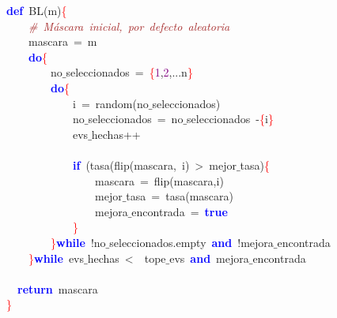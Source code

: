 \noindent
\mbox{}\textbf{\textcolor{Blue}{def}}\ BL\textcolor{BrickRed}{(}m\textcolor{BrickRed}{)}\textcolor{Red}{\{} \\
\mbox{}\ \ \ \ \textit{\textcolor{Brown}{\#\ Máscara\ inicial,\ por\ defecto\ aleatoria}} \\
\mbox{}\ \ \ \ mascara\ \textcolor{BrickRed}{=}\ m \\
\mbox{}\ \ \ \ \textbf{\textcolor{Blue}{do}}\textcolor{Red}{\{} \\
\mbox{}\ \ \ \ \ \ \ \ no$\_$seleccionados\ \textcolor{BrickRed}{=}\ \textcolor{Red}{\{}\textcolor{Purple}{1}\textcolor{BrickRed}{,}\textcolor{Purple}{2}\textcolor{BrickRed}{,...}n\textcolor{Red}{\}} \\
\mbox{}\ \ \ \ \ \ \ \ \textbf{\textcolor{Blue}{do}}\textcolor{Red}{\{} \\
\mbox{}\ \ \ \ \ \ \ \ \ \ \ \ i\ \textcolor{BrickRed}{=}\ random\textcolor{BrickRed}{(}no$\_$seleccionados\textcolor{BrickRed}{)} \\
\mbox{}\ \ \ \ \ \ \ \ \ \ \ \ no$\_$seleccionados\ \textcolor{BrickRed}{=}\ no$\_$seleccionados\ \textcolor{BrickRed}{-}\textcolor{Red}{\{}i\textcolor{Red}{\}} \\
\mbox{}\ \ \ \ \ \ \ \ \ \ \ \ evs$\_$hechas\textcolor{BrickRed}{++} \\
\mbox{} \\
\mbox{}\ \ \ \ \ \ \ \ \ \ \ \ \textbf{\textcolor{Blue}{if}}\ \textcolor{BrickRed}{(}tasa\textcolor{BrickRed}{(}flip\textcolor{BrickRed}{(}mascara\textcolor{BrickRed}{,}\ i\textcolor{BrickRed}{)}\ \textcolor{BrickRed}{\textgreater{}}\ mejor$\_$tasa\textcolor{BrickRed}{)}\textcolor{Red}{\{} \\
\mbox{}\ \ \ \ \ \ \ \ \ \ \ \ \ \ \ \ mascara\ \textcolor{BrickRed}{=}\ flip\textcolor{BrickRed}{(}mascara\textcolor{BrickRed}{,}i\textcolor{BrickRed}{)} \\
\mbox{}\ \ \ \ \ \ \ \ \ \ \ \ \ \ \ \ mejor$\_$tasa\ \textcolor{BrickRed}{=}\ tasa\textcolor{BrickRed}{(}mascara\textcolor{BrickRed}{)} \\
\mbox{}\ \ \ \ \ \ \ \ \ \ \ \ \ \ \ \ mejora$\_$encontrada\ \textcolor{BrickRed}{=}\ \textbf{\textcolor{Blue}{true}} \\
\mbox{}\ \ \ \ \ \ \ \ \ \ \ \ \textcolor{Red}{\}} \\
\mbox{}\ \ \ \ \ \ \ \ \textcolor{Red}{\}}\textbf{\textcolor{Blue}{while}}\ \textcolor{BrickRed}{!}no$\_$seleccionados\textcolor{BrickRed}{.}empty\ \textbf{\textcolor{Blue}{and}}\ \textcolor{BrickRed}{!}mejora$\_$encontrada \\
\mbox{}\ \ \ \ \textcolor{Red}{\}}\textbf{\textcolor{Blue}{while}}\ evs$\_$hechas\ \textcolor{BrickRed}{\textless{}}\ \ tope$\_$evs\ \textbf{\textcolor{Blue}{and}}\ mejora$\_$encontrada \\
\mbox{} \\
\mbox{}\ \ \textbf{\textcolor{Blue}{return}}\ mascara \\
\mbox{}\textcolor{Red}{\}} \\
\mbox{}
